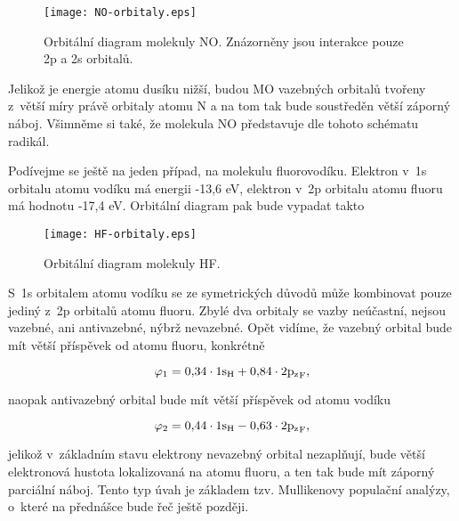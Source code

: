 \begin{figure} [htb]
\centering
\texttt{[image: NO-orbitaly.eps]}
\caption[Orbitaly NO]{Orbitální diagram molekuly NO. Znázorněny jsou interakce pouze 2p a 2s orbitalů.}
\label{obr:NO-orbitaly}
\end{figure}

\noindent Jelikož je energie atomu dusíku nižší, budou MO vazebných orbitalů tvořeny z~větší míry právě orbitaly atomu N a na tom tak bude soustředěn větší záporný náboj. Všimněme si také, že molekula NO představuje dle tohoto schématu radikál.


Podívejme se ještě na jeden případ, na molekulu fluorovodíku. Elektron v~1s orbitalu atomu vodíku má energii -13,6 eV, elektron v~2p orbitalu atomu fluoru má hodnotu -17,4 eV. Orbitální diagram pak bude vypadat takto

\begin{figure} [htb]
\centering
\texttt{[image: HF-orbitaly.eps]}
\caption[Orbitaly HF]{Orbitální diagram molekuly HF.}
\label{obr:HF-orbitaly}
\end{figure}

\noindent S~1s orbitalem atomu vodíku se ze symetrických důvodů může kombinovat pouze jediný z~2p orbitalů atomu fluoru. Zbylé dva orbitaly se vazby neúčastní, nejsou vazebné, ani antivazebné, nýbrž nevazebné. Opět vidíme, že vazebný orbital bude mít větší příspěvek  od atomu fluoru, konkrétně

\begin{equation}
\varphi_1 = 0{,}34 \cdot 1 \mathrm{s}_{\mathrm{H}} + 0{,}84 \cdot 2 \mathrm{p_z}_{\mathrm{F}},
\label{rov:ElStrukt-22}
\end{equation}


\noindent naopak antivazebný orbital bude mít větší příspěvek od atomu vodíku

\begin{equation}
\varphi_2 = 0{,}44 \cdot 1 \mathrm{s}_{\mathrm{H}} - 0{,}63 \cdot 2 \mathrm{p_z}_{\mathrm{F}},
\label{rov:ElStrukt-23}
\end{equation}


\noindent jelikož v~základním stavu elektrony nevazebný orbital nezaplňují, bude větší elektronová hustota lokalizovaná na atomu fluoru, a ten tak bude mít záporný parciální náboj. Tento typ úvah je základem tzv. Mullikenovy populační analýzy, o~které na přednášce bude řeč ještě později.


